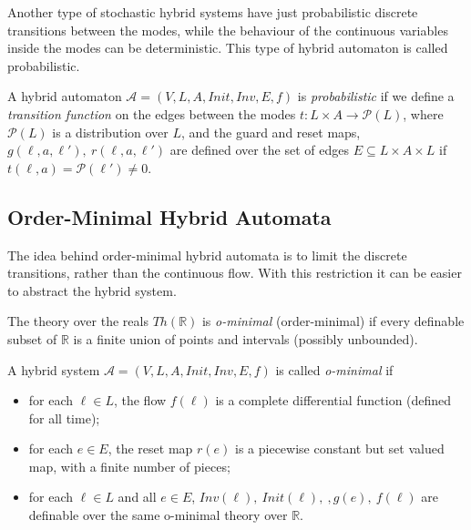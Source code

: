Another type of stochastic hybrid systems have just probabilistic discrete transitions between the modes, while the behaviour of the continuous variables inside the modes can be deterministic. This type of hybrid automaton is called probabilistic.

\begin{defi}
A hybrid automaton $\mathcal{A}=(V,L,A,Init,Inv,E,f)$ is \emph{probabilistic} if we define a \emph{transition function} on the edges between the modes $t : L\times A \rightarrow \mathcal{P}(L)$, where $\mathcal{P}(L)$ is a distribution over $L$, and the guard and reset maps, $g(\ell,a,\ell'),\ r(\ell,a,\ell')$  are defined over the set of edges $E \subseteq L \times A \times L$ if $t(\ell,a)=\mathcal{P}(\ell')\neq 0$.
\end{defi}


\subsection{Order-Minimal Hybrid Automata}
The idea behind order-minimal hybrid automata is to limit the discrete transitions, rather than the continuous flow. With this restriction it can be easier to abstract the hybrid system.




\begin{defi}
The theory over the reals $Th(\mathbb{R})$ is \emph{o-minimal} (order-minimal) if every definable subset of $\mathbb{R}$ is a finite union of points and intervals (possibly unbounded).
\end{defi}

\begin{defi}
A hybrid system $\mathcal{A}=(V,L,A,Init,Inv,E,f)$ is called \emph{o-minimal} if
\begin{itemize}
    \item{for each $\ell\in L$, the flow $f(\ell)$ is a complete differential function (defined for all time);}
    \item{for each $e\in E$, the reset map $r(e)$ is a piecewise constant but set valued map, with a finite number of pieces;}
    \item{for each $\ell\in L$ and all $e\in E$, $Inv(\ell),\ Init(\ell),\ , g(e),\ f(\ell)$ are definable over the same o-minimal theory over $\mathbb{R}$.}
\end{itemize}
\end{defi}

